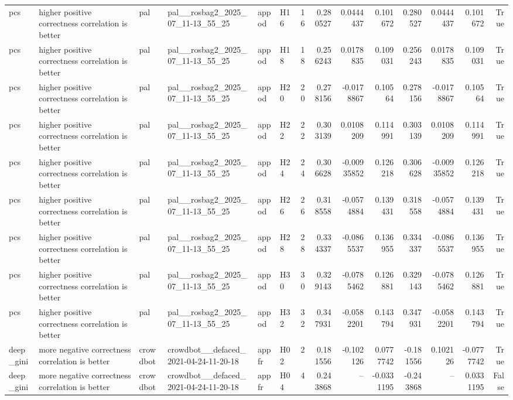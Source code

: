 \begin{longtable}{llllllrrrrrrrr}
pcs & higher positive correctness correlation is better & pal & pal\_\_rosbag2\_2025\_07\_11-13\_55\_25 & appod & H16 & 16 & 0.280527 & 0.0444437 & 0.101672 & 0.280527 & 0.0444437 & 0.101672 & True \\
pcs & higher positive correctness correlation is better & pal & pal\_\_rosbag2\_2025\_07\_11-13\_55\_25 & appod & H18 & 18 & 0.256243 & 0.0178835 & 0.109031 & 0.256243 & 0.0178835 & 0.109031 & True \\
pcs & higher positive correctness correlation is better & pal & pal\_\_rosbag2\_2025\_07\_11-13\_55\_25 & appod & H20 & 20 & 0.278156 & -0.0178867 & 0.10564 & 0.278156 & -0.0178867 & 0.10564 & True \\
pcs & higher positive correctness correlation is better & pal & pal\_\_rosbag2\_2025\_07\_11-13\_55\_25 & appod & H22 & 22 & 0.303139 & 0.0108209 & 0.114991 & 0.303139 & 0.0108209 & 0.114991 & True \\
pcs & higher positive correctness correlation is better & pal & pal\_\_rosbag2\_2025\_07\_11-13\_55\_25 & appod & H24 & 24 & 0.306628 & -0.00935852 & 0.126218 & 0.306628 & -0.00935852 & 0.126218 & True \\
pcs & higher positive correctness correlation is better & pal & pal\_\_rosbag2\_2025\_07\_11-13\_55\_25 & appod & H26 & 26 & 0.318558 & -0.0574884 & 0.139431 & 0.318558 & -0.0574884 & 0.139431 & True \\
pcs & higher positive correctness correlation is better & pal & pal\_\_rosbag2\_2025\_07\_11-13\_55\_25 & appod & H28 & 28 & 0.334337 & -0.0865537 & 0.136955 & 0.334337 & -0.0865537 & 0.136955 & True \\
pcs & higher positive correctness correlation is better & pal & pal\_\_rosbag2\_2025\_07\_11-13\_55\_25 & appod & H30 & 30 & 0.329143 & -0.0785462 & 0.126881 & 0.329143 & -0.0785462 & 0.126881 & True \\
pcs & higher positive correctness correlation is better & pal & pal\_\_rosbag2\_2025\_07\_11-13\_55\_25 & appod & H32 & 32 & 0.347931 & -0.0582201 & 0.143794 & 0.347931 & -0.0582201 & 0.143794 & True \\
deep\_gini & more negative correctness correlation is better & crowdbot & crowdbot\_\_defaced\_2021-04-24-11-20-18 & appfr & H02 & 2 & 0.181556 & -0.102126 & 0.0777742 & -0.181556 & 0.102126 & -0.0777742 & True \\
deep\_gini & more negative correctness correlation is better & crowdbot & crowdbot\_\_defaced\_2021-04-24-11-20-18 & appfr & H04 & 4 & 0.243868 & -- & -0.0331195 & -0.243868 & -- & 0.0331195 & False \\

\end{longtable}
